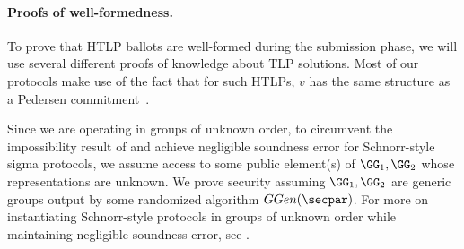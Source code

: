 

% 

\paragraph{Proofs of well-formedness.}

To prove that HTLP ballots are well-formed during the submission phase, we will use several different proofs of knowledge about TLP solutions. 
Most of our protocols make use of the fact that for such HTLPs, $v$ has the same structure as a Pedersen commitment~\cite{C:Pedersen91}.


Since we are operating in groups of unknown order, to circumvent the impossibility result of \cite{TCC:BanCamKre10} and achieve negligible soundness error for Schnorr-style sigma protocols, we assume access to some public element(s) of $\GG_1, \GG_2$ whose representations are unknown. We prove security assuming $\GG_1, \GG_2$ are generic groups output by some randomized algorithm $GGen(\secpar)$.
For more on instantiating Schnorr-style protocols in groups of unknown order while maintaining negligible soundness error, see \cite{C:BonBunFis19}.

